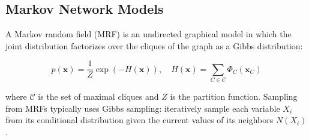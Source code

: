 \documentclass[a4paper,11pt]{article}
\begin{document}
\subsection{Markov Network Models}
\label{sec:markov}

A Markov random field (MRF) \citep{Hammersley_and_Clifford:1968} is an undirected graphical model in which the joint distribution factorizes over the cliques of the graph as a Gibbs distribution:

\begin{equation}
  p(\mathbf{x}) = \frac{1}{Z}\exp\!\left(-H(\mathbf{x})\right),\quad
  H(\mathbf{x}) = \sum_{C \in \mathcal{C}} \Phi_C(\mathbf{x}_C)
\end{equation}

where $\mathcal{C}$ is the set of maximal cliques and $Z$ is the partition function.  Sampling from MRFs typically uses Gibbs sampling: iteratively sample each variable $X_i$ from its conditional distribution given the current values of its neighbors $N(X_i)$.
\end{document}
